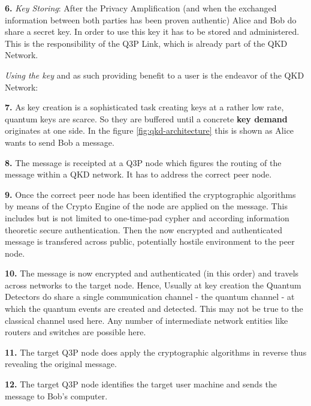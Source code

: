 \medskip

\textbf{6.} \emph{Key Storing}: After the Privacy Amplification (and when the exchanged information between both parties has been proven authentic) Alice and Bob do share a secret key. In order to use this key it has to be stored and administered. This is the responsibility of the Q3P Link, which is already part of the QKD Network.

\bigskip

\emph{Using the key} and as such providing benefit to a user is the endeavor of the QKD Network:

\medskip

\textbf{7.} As key creation is a sophisticated task creating keys at a rather low rate, quantum keys are scarce. So they are buffered until a concrete \textbf{key demand} originates at one side. In the figure \ref{fig:qkd-architecture} this is shown as Alice wants to send Bob a message.

\medskip

\textbf{8.} The message is receipted at a Q3P node which figures the routing of the message within a QKD network. It has to address the correct peer node.

\medskip

\textbf{9.} Once the correct peer node has been identified the cryptographic algorithms by means of the Crypto Engine of the node are applied on the message. This includes but is not limited to one-time-pad cypher and according information theoretic secure authentication. Then the now encrypted and authenticated message is transfered across public, potentially hostile environment to the peer node.

\medskip

\textbf{10.} The message is now encrypted and authenticated (in this order) and travels across networks to the target node. Hence, Usually at key creation the Quantum Detectors do share a single communication channel - the quantum channel - at which the quantum events are created and detected. This may not be true to the classical channel used here. Any number of intermediate network entities like routers and switches are possible here.

\medskip

\textbf{11.} The target Q3P node does apply the cryptographic algorithms in reverse thus revealing the original message.

\medskip

\textbf{12.} The target Q3P node identifies the target user machine and sends the message to Bob's computer.

